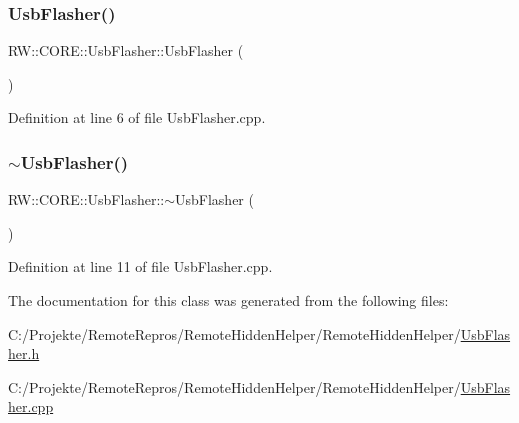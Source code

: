 \subsubsection{\texorpdfstring{Usb\+Flasher()}{UsbFlasher()}}
{\footnotesize\ttfamily R\+W\+::\+C\+O\+R\+E\+::\+Usb\+Flasher\+::\+Usb\+Flasher (\begin{DoxyParamCaption}{ }\end{DoxyParamCaption})}



Definition at line 6 of file Usb\+Flasher.\+cpp.

\hypertarget{class_r_w_1_1_c_o_r_e_1_1_usb_flasher_a8ee30958b7e2fb03a7887f945cfd9698}{}\label{class_r_w_1_1_c_o_r_e_1_1_usb_flasher_a8ee30958b7e2fb03a7887f945cfd9698} 
\subsubsection{\texorpdfstring{$\sim$\+Usb\+Flasher()}{~UsbFlasher()}}
{\footnotesize\ttfamily R\+W\+::\+C\+O\+R\+E\+::\+Usb\+Flasher\+::$\sim$\+Usb\+Flasher (\begin{DoxyParamCaption}{ }\end{DoxyParamCaption})}



Definition at line 11 of file Usb\+Flasher.\+cpp.



The documentation for this class was generated from the following files\+:\begin{DoxyCompactItemize}
\item 
C\+:/\+Projekte/\+Remote\+Repros/\+Remote\+Hidden\+Helper/\+Remote\+Hidden\+Helper/\hyperlink{_usb_flasher_8h}{Usb\+Flasher.\+h}\item 
C\+:/\+Projekte/\+Remote\+Repros/\+Remote\+Hidden\+Helper/\+Remote\+Hidden\+Helper/\hyperlink{_usb_flasher_8cpp}{Usb\+Flasher.\+cpp}\end{DoxyCompactItemize}
